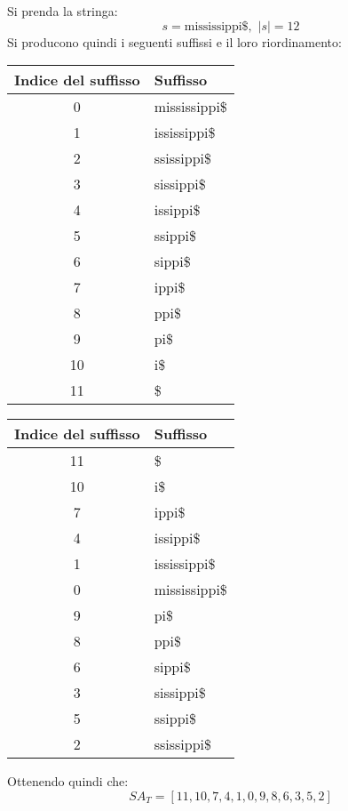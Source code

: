 \begin{esempio}
  Si prenda la stringa:
  \[s=\mbox{mississippi\$},\,\,|s|=12\]
  Si producono quindi i seguenti suffissi e il loro riordinamento:
  \begin{table}[H]
    \footnotesize
    \centering
    \begin{tabular}{c|l}
      \textbf{Indice del suffisso} & \textbf{Suffisso}\\
      \hline
      0 & mississippi\$\\
      1 & ississippi\$\\
      2 & ssissippi\$\\
      3 & sissippi\$\\
      4 & issippi\$\\
      5 & ssippi\$\\
      6 & sippi\$\\
      7 & ippi\$\\
      8 & ppi\$\\
      9 & pi\$\\
      10 & i\$\\
      11 & \$\\
    \end{tabular}
    \quad
    \begin{tabular}{c|l} 
      \textbf{Indice del suffisso} & \textbf{Suffisso}\\ 
      \hline
      11 & \$\\
      10 & i\$\\
      7 & ippi\$\\
      4 & issippi\$\\
      1 & ississippi\$\\
      0 & mississippi\$\\
      9 & pi\$\\
      8 & ppi\$\\
      6 & sippi\$\\
      3 & sissippi\$\\
      5 & ssippi\$\\
      2 & ssissippi\$\\
    \end{tabular}
  \end{table}
  Ottenendo quindi che:
  \[SA_T=[11,10,7,4,1,0,9,8,6,3,5,2]\]
\end{esempio}

